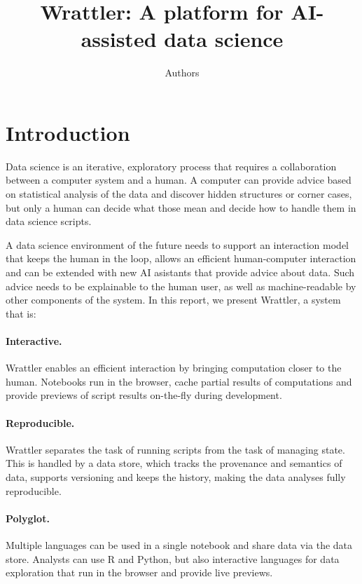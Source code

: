 \documentclass[sigplan,preprint,10pt]{acmart}\settopmatter{printfolios=true,printccs=false,printacmref=false}
\title{Wrattler: \textnormal{A platform for AI-assisted data science}}
\author{Authors}
\theoremstyle{plain}
\theoremstyle{definition}
\begin{document}
\maketitle

\section{Introduction}
Data science is an iterative, exploratory process that requires a collaboration between a 
computer system and a human. A computer can provide advice based on statistical analysis of the 
data and discover hidden structures or corner cases, but only a human can decide what those mean
and decide how to handle them in data science scripts.

A data science environment of the future needs to support an interaction model that keeps the 
human in the loop, allows an efficient human-computer interaction and can be extended with new 
AI asistants that provide advice about data. Such advice needs to be explainable to the human user,
as well as machine-readable by other components of the system. In this report, we present Wrattler, 
a system that is:

\paragraph{Interactive.}
Wrattler enables an efficient interaction by bringing computation closer to the human.
Notebooks run in the browser, cache partial results of computations and provide previews
of script results on-the-fly during development.

\paragraph{Reproducible.} 
Wrattler separates the task of running scripts from the task of managing state. 
This is handled by a data store, which tracks the provenance and semantics of data, supports 
versioning and keeps the history, making the data analyses fully reproducible.

\paragraph{Polyglot.}
Multiple languages can be used in a single notebook and share data via the data store.
Analysts can use R and Python, but also interactive languages for data exploration
that run in the browser and provide live previews.
\end{document}
